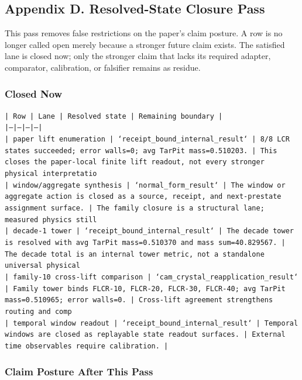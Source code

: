 \documentclass[11pt]{article}
\begin{document}
\subsection*{Appendix D. Resolved-State Closure Pass}

This pass removes false restrictions on the paper's claim posture. A row is no longer called open merely because a stronger future claim exists. The satisfied lane is closed now; only the stronger claim that lacks its required adapter, comparator, calibration, or falsifier remains as residue.

\subsubsection*{Closed Now}

\noindent\texttt{| Row | Lane | Resolved state | Remaining boundary |}\\
\noindent\texttt{|---|---|---|---|}\\
\noindent\texttt{| paper lift enumeration | `receipt\_bound\_internal\_result` | 8/8 LCR states succeeded; error walls=0; avg TarPit mass=0.510203. | This closes the paper-local finite lift readout, not every stronger physical interpretatio}\\
\noindent\texttt{| window/aggregate synthesis | `normal\_form\_result` | The window or aggregate action is closed as a source, receipt, and next-prestate assignment surface. | The family closure is a structural lane; measured physics still}\\
\noindent\texttt{| decade-1 tower | `receipt\_bound\_internal\_result` | The decade tower is resolved with avg TarPit mass=0.510370 and mass sum=40.829567. | The decade total is an internal tower metric, not a standalone universal physical }\\
\noindent\texttt{| family-10 cross-lift comparison | `cam\_crystal\_reapplication\_result` | Family tower binds FLCR-10, FLCR-20, FLCR-30, FLCR-40; avg TarPit mass=0.510965; error walls=0. | Cross-lift agreement strengthens routing and comp}\\
\noindent\texttt{| temporal window readout | `receipt\_bound\_internal\_result` | Temporal windows are closed as replayable state readout surfaces. | External time observables require calibration. |}\\

\subsubsection*{Claim Posture After This Pass}
\end{document}
